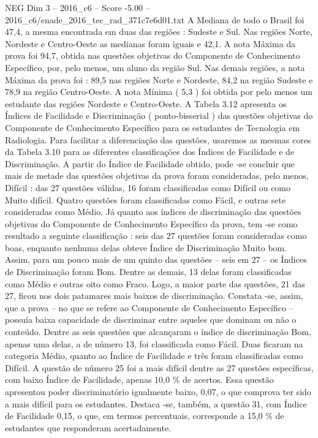 \begin{textsample}{NEG Dim 3 – 2016\_c6 – Score -5.00 – 2016\_c6/enade\_2016\_tec\_rad\_371c7e6d01.txt}
A Mediana de todo o Brasil foi 47,4, a mesma encontrada em duas das regiões : Sudeste e Sul.
Nas regiões Norte, Nordeste e Centro-Oeste as medianas foram iguais e 42,1.
A nota Máxima da prova foi 94,7, obtida nas questões objetivas do Componente de Conhecimento Específico, por, pelo menos, um aluno da região Sul.
Nas demais regiões, a nota Máxima da prova foi : 89,5 nas regiões Norte e Nordeste, 84,2 na região Sudeste e 78,9 na região Centro-Oeste.
A nota Mínima ( 5,3 ) foi obtida por pelo menos um estudante das regiões Nordeste e Centro-Oeste.
A Tabela 3.12 apresenta os Índices de Facilidade e Discriminação ( ponto-bisserial ) das questões objetivas do Componente de Conhecimento Específico para os estudantes de Tecnologia em Radiologia.
Para facilitar a diferenciação das questões, usaremos as mesmas cores da Tabela 3.10 para as diferentes classificações dos Índices de Facilidade e de Discriminação.
A partir do Índice de Facilidade obtido, pode -se concluir que mais de metade das questões objetivas da prova foram consideradas, pelo menos, Difícil : das 27 questões válidas, 16 foram classificadas como Difícil ou como Muito difícil.
Quatro questões foram classificadas como Fácil, e outras sete consideradas como Médio.
Já quanto aos índices de discriminação das questões objetivas do Componente de Conhecimento Específico da prova, tem -se como resultado a seguinte classificação : seis das 27 questões foram consideradas como boas, enquanto nenhuma delas obteve Índice de Discriminação Muito bom.
Assim, para um pouco mais de um quinto das questões – seis em 27 – os Índices de Discriminação foram Bom.
Dentre as demais, 13 delas foram classificadas como Médio e outras oito como Fraco.
Logo, a maior parte das questões, 21 das 27, ficou nos dois patamares mais baixos de discriminação.
Constata -se, assim, que a prova – no que se refere ao Componente de Conhecimento Específico – possuía baixa capacidade de discriminar entre aqueles que dominam ou não o conteúdo.
Dentre as seis questões que alcançaram o índice de discriminação Bom, apenas uma delas, a de número 13, foi classificada como Fácil.
Duas ficaram na categoria Médio, quanto ao Índice de Facilidade e três foram classificadas como Difícil.
A questão de número 25 foi a mais difícil dentre as 27 questões específicas, com baixo Índice de Facilidade, apenas 10,0 \% de acertos.
Essa questão apresentou poder discriminatório igualmente baixo, 0,07, o que comprova ter sido a mais difícil para os estudantes.
Destaca -se, também, a questão 31, com Índice de Facilidade 0,15, o que, em termos percentuais, corresponde a 15,0 \% de estudantes que responderam acertadamente.

\end{textsample}
